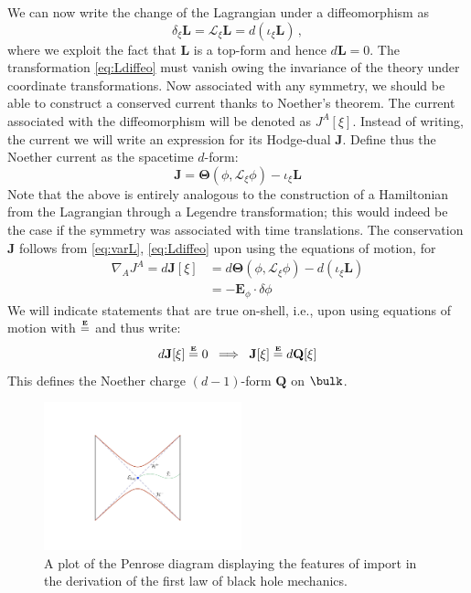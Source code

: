 \documentclass[12pt,openany]{book}
\begin{document}
We can now write the change of the Lagrangian under a diffeomorphism as
%
\begin{equation}
\delta_\xi \mathbf{L} = \mathscr{L}_\xi \mathbf{L}  = d(\iota_\xi \mathbf{L})\,,
\label{eq:Ldiffeo}
\end{equation}
%
where we exploit the fact that $\mathbf{L}$ is a top-form and hence $d\mathbf{L} =0$.
The transformation \eqref{eq:Ldiffeo} must vanish owing the invariance of the theory under coordinate transformations. Now associated with any symmetry, we should be able to construct a conserved current thanks to Noether's theorem. The current associated with the diffeomorphism will be denoted as $J^A[\xi]$. Instead of writing, the current we will write an expression for its Hodge-dual $\mathbf{J}$. Define thus the
Noether  current as the spacetime $d$-form:
%
\begin{equation}
\mathbf{J} = \bm{\Theta}(\phi,\mathscr{L}_\xi\phi) - \iota_\xi \mathbf{L}
\label{}
\end{equation}
%
Note that the above is entirely analogous to the construction of a Hamiltonian from the Lagrangian through a Legendre transformation; this would indeed be the case if the symmetry was associated with time translations. The conservation $\mathbf{J}$ follows from \eqref{eq:varL}, \eqref{eq:Ldiffeo} upon using the equations of motion, for
%
\begin{align}
\nabla_A J^A = d\mathbf{J}[\xi] &= d\bm{\Theta}(\phi,\mathscr{L}_\xi \phi) - d(\iota_\xi \mathbf{L}) \nonumber \\
& = -\mathbf{E}_\phi \cdot \delta\phi
\label{eq:Jcons}
\end{align}
%
We will indicate statements that are true on-shell, i.e., upon using equations of motion with
$\overset{\textbf{\tiny{E}}}{=} $ and thus write:
%
\begin{equation}
d\mathbf{J}[\xi] \overset{\textbf{\tiny{E}}}{=} 0  \;\; \Longrightarrow \;\; \mathbf{J}[\xi]  \overset{\textbf{\tiny{E}}}{=}  d\mathbf{Q}[\xi]
\label{}
\end{equation}
%
This defines the Noether charge $(d-1)$-form $\mathbf{Q}$ on $\bulk$.


\begin{figure}[tp]
\begin{center}
\includegraphics[width=2.25in]{figures/Sads-wald}
\caption{A plot of the \SAdS{} Penrose diagram displaying the features of import in the derivation of the first law of black hole mechanics.
}
\label{f:sadsW}
\end{center}
\end{figure}
%
\end{document}
